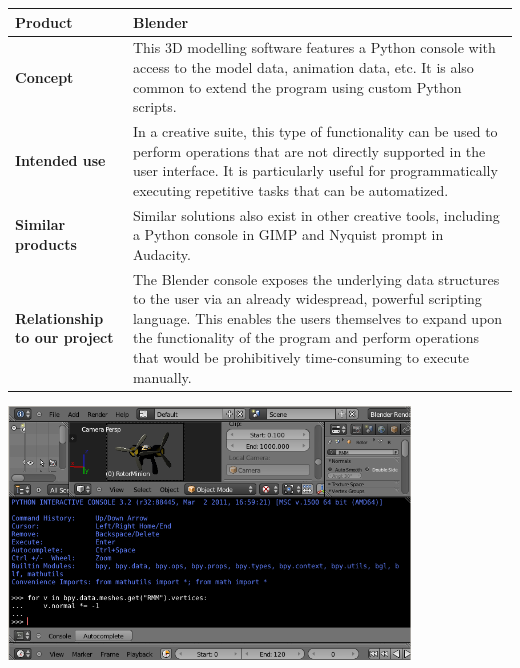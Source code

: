 \begin{center}
\begin{tabularx}{\textwidth}{ l X }
\hline
\textbf{Product} & Blender \\ \hline
\textbf{Concept} & This 3D modelling software features a Python console with access to the model data, animation data, etc. It is also common to extend the program using custom Python scripts. \\ \hline
\textbf{Intended use} & In a creative suite, this type of functionality can be used to perform operations that are not directly supported in the user interface. It is particularly useful for programmatically executing repetitive tasks that can be automatized. \\ \hline
\textbf{Similar products} & Similar solutions also exist in other creative tools, including a Python console in GIMP and Nyquist prompt in Audacity. \\ \hline
\textbf{Relationship to our project} & The Blender console exposes the underlying data structures to the user via an already widespread, powerful scripting language. This enables the users themselves to expand upon the functionality of the program and perform operations that would be prohibitively time-consuming to execute manually. \\ \hline
\end{tabularx}
\label{tab:blenderc}
\end{center}

\begin{center}
\includegraphics[width = 0.8\textwidth]{image/blender.png}
\label{blendercimage}%
\end{center}

